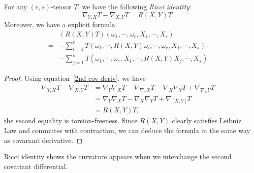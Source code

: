 \begin{prop}\label{Ricci identity}
    For any $(r,s)$-tensor $T$, we have the following \emph{Ricci identity}:
    \[\nabla_{Y,X}T-\nabla_{X,Y}T=R(X,Y)T.\]
    Moreover, we have a explicit formula
    \begin{equation}
        \begin{aligned}
            &(R(X,Y)T)(\omega_1,\cdots,\omega_r,X_1,\cdots,X_s)\\
            =&-\sum_{i=1}^rT(\omega_1,\cdots,R(X,Y)\omega_i,\cdots,\omega_r,X_1,\cdots,X_s)\\
            &-\sum_{j=1}^sT(\omega_1,\cdots,\omega_r,X_1,\cdots,R(X,Y)X_j,\cdots,X_s)
        \end{aligned}\label{curvature formula}
    \end{equation}
\end{prop}
\begin{proof}
    Using equation~\eqref{2nd cov deriv}, we have
    \begin{align*}
        \nabla_{Y,X}T-\nabla_{X,Y}T&=\nabla_Y\nabla_XT-\nabla_{\nabla_YX}T-\nabla_X\nabla_YT+\nabla_{\nabla_XY}T\\
        &=\nabla_Y\nabla_XT-\nabla_X\nabla_YT+\nabla_{[X,Y]}T\\
        &=R(X,Y)T,
    \end{align*}
    the second equality is torsion-freeness.
    Since $R(X,Y)$ clearly satisfies Leibniz Law and commutes with contraction, we can deduce the formula in the same way as covariant derivative.
\end{proof}

Ricci identity shows the curvature appears when we interchange the second covariant differential.

